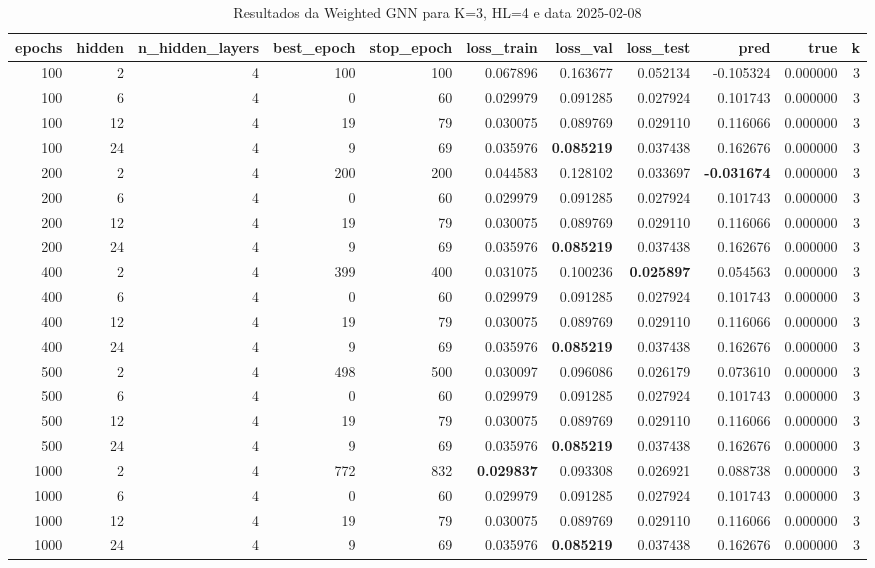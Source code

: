 \begin{table}
\caption{Resultados da Weighted GNN para K=3, HL=4 e data 2025-02-08}
\label{tab:weighted_gnn_results_k3_hl4_d20250208}
\begin{tabular}{rrrrrrrrrrr}
\toprule
epochs & hidden & n\_hidden\_layers & best\_epoch & stop\_epoch & loss\_train & loss\_val & loss\_test & pred & true & k \\
\midrule
100 & 2 & 4 & 100 & 100 & 0.067896 & 0.163677 & 0.052134 & -0.105324 & 0.000000 & 3 \\
100 & 6 & 4 & 0 & 60 & 0.029979 & 0.091285 & 0.027924 & 0.101743 & 0.000000 & 3 \\
100 & 12 & 4 & 19 & 79 & 0.030075 & 0.089769 & 0.029110 & 0.116066 & 0.000000 & 3 \\
100 & 24 & 4 & 9 & 69 & 0.035976 & \textbf{0.085219} & 0.037438 & 0.162676 & 0.000000 & 3 \\
200 & 2 & 4 & 200 & 200 & 0.044583 & 0.128102 & 0.033697 & \textbf{-0.031674} & 0.000000 & 3 \\
200 & 6 & 4 & 0 & 60 & 0.029979 & 0.091285 & 0.027924 & 0.101743 & 0.000000 & 3 \\
200 & 12 & 4 & 19 & 79 & 0.030075 & 0.089769 & 0.029110 & 0.116066 & 0.000000 & 3 \\
200 & 24 & 4 & 9 & 69 & 0.035976 & \textbf{0.085219} & 0.037438 & 0.162676 & 0.000000 & 3 \\
400 & 2 & 4 & 399 & 400 & 0.031075 & 0.100236 & \textbf{0.025897} & 0.054563 & 0.000000 & 3 \\
400 & 6 & 4 & 0 & 60 & 0.029979 & 0.091285 & 0.027924 & 0.101743 & 0.000000 & 3 \\
400 & 12 & 4 & 19 & 79 & 0.030075 & 0.089769 & 0.029110 & 0.116066 & 0.000000 & 3 \\
400 & 24 & 4 & 9 & 69 & 0.035976 & \textbf{0.085219} & 0.037438 & 0.162676 & 0.000000 & 3 \\
500 & 2 & 4 & 498 & 500 & 0.030097 & 0.096086 & 0.026179 & 0.073610 & 0.000000 & 3 \\
500 & 6 & 4 & 0 & 60 & 0.029979 & 0.091285 & 0.027924 & 0.101743 & 0.000000 & 3 \\
500 & 12 & 4 & 19 & 79 & 0.030075 & 0.089769 & 0.029110 & 0.116066 & 0.000000 & 3 \\
500 & 24 & 4 & 9 & 69 & 0.035976 & \textbf{0.085219} & 0.037438 & 0.162676 & 0.000000 & 3 \\
1000 & 2 & 4 & 772 & 832 & \textbf{0.029837} & 0.093308 & 0.026921 & 0.088738 & 0.000000 & 3 \\
1000 & 6 & 4 & 0 & 60 & 0.029979 & 0.091285 & 0.027924 & 0.101743 & 0.000000 & 3 \\
1000 & 12 & 4 & 19 & 79 & 0.030075 & 0.089769 & 0.029110 & 0.116066 & 0.000000 & 3 \\
1000 & 24 & 4 & 9 & 69 & 0.035976 & \textbf{0.085219} & 0.037438 & 0.162676 & 0.000000 & 3 \\
\bottomrule
\end{tabular}
\end{table}

